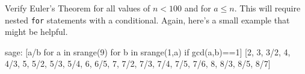 \begin{sageverbatim}\end{sageverbatim}
%
%
Verify Euler's Theorem for all values of $n<100$ and for $a \leq n$.  This will require nested \verb?for? statements with a conditional.  Again, here's a small example that might be helpful.
%
\begin{sageexample}
sage: [a/b for a in srange(9) for b in srange(1,a) if gcd(a,b)==1]
[2, 3, 3/2, 4, 4/3, 5, 5/2, 5/3, 5/4, 6, 6/5,
 7, 7/2, 7/3, 7/4, 7/5, 7/6, 8, 8/3, 8/5, 8/7]
\end{sageexample}
%
\begin{sageverbatim}\end{sageverbatim}
%

